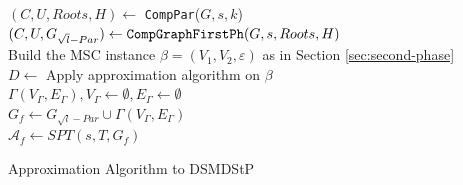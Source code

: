 \begin{algorithm}
\BlankLine
  $(C, U, Roots, H) \gets$ \verb|CompPar|($G, s, k$) \\ %
  $(C, U, G_{\sqrt{l}-Par})\gets\verb|CompGraphFirstPh|(G,s,Roots,H)$ \\	
  Build the MSC instance $\beta = (V_1, V_2, \varepsilon)$ as in Section \ref{sec:second-phase} \\
  $D \gets $ Apply approximation algorithm \cite{Chekuri2004} on $\beta$\\
  $\varGamma(V_{\varGamma},E_{\varGamma}), V_{\varGamma} \gets \emptyset, E_{\varGamma} \gets \emptyset$\\
  $G_f \gets G_{\sqrt{l}-Par} \cup \varGamma(V_\varGamma,E_\varGamma)$ \\
  $\mathcal{A}_f \gets SPT(s, T, G_f)$


\caption{Approximation Algorithm to \mbox{DSMDStP}} 
\label{alg:approximation}
\end{algorithm}


